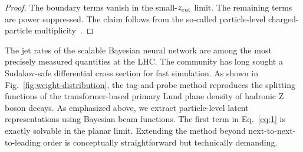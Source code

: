 \begin{proof}
The boundary terms vanish in the small-$z_{\rm cut}$ limit. The
remaining terms are power suppressed. The claim follows from the
so-called particle-level charged-particle
multiplicity~\cite{TPC:0138-TACO-Topological-Angular-Ordered-Conformal-Observables-September-19-2026}.
\end{proof}

The jet rates of the scalable Bayesian neural network are among the most
precisely measured quantities at the LHC. The community has long sought
a Sudakov-safe differential cross section for fast simulation. As shown
in Fig.~\ref{fig:weight-distribution}, the tag-and-probe method
reproduces the splitting functions of the transformer-based primary Lund
plane density of hadronic Z boson decays. As emphasized above, we
extract particle-level latent representations using Bayesian beam
functions. The first term in Eq.~\eqref{eq:1} is exactly solvable in the
planar limit. Extending the method beyond next-to-next-to-leading order
is conceptually straightforward but technically demanding.

